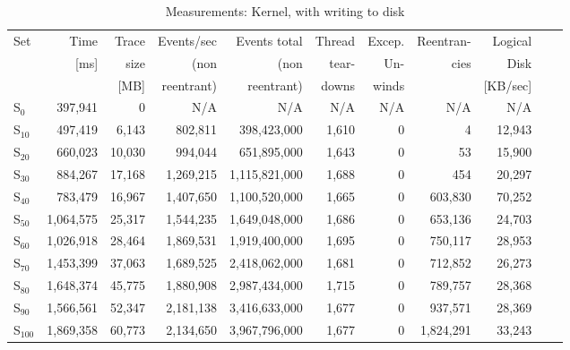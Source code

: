 \begin{table}[h] 
\footnotesize
\addtolength{\tabcolsep}{-2pt}
\caption{Measurements: Kernel, with writing to disk}
\label{MeasurementsKernelWithWriting}
\centering          

\begin{tabular}{l r r r r r r r r r r}    
\hline\hline 
Set				&	Time 		&	Trace &	Events/sec	&Events total	&	Thread 		&	Excep. 	&	Reentran-	&	Logical		 \\
					& [ms]		& size & (non					&(non 				&	tear-			& Un-			& cies			& Disk	 \\
					& 				& [MB] & reentrant)		& reentrant)	& downs			&	winds		&						& [KB/sec]				\\
\hline
S$_{0}$   &	397,941	&	0	&	N/A	&	N/A	&	N/A	&	N/A	&	N/A	&	N/A	\\
\hline
S$_{10}$ 	&	497,419	&	6,143	&	802,811	&	398,423,000	&	1,610	&	0	&	4	&	12,943	\\
S$_{20}$ 	&	660,023	&	10,030	&	994,044	&	651,895,000	&	1,643	&	0	&	53	&	15,900	\\
S$_{30}$ 	&	884,267	&	17,168	&	1,269,215	&	1,115,821,000	&	1,688	&	0	&	454	&	20,297	\\
S$_{40}$ 	&	783,479	&	16,967	&	1,407,650	&	1,100,520,000	&	1,665	&	0	&	603,830	&	70,252	\\
S$_{50}$ 	&	1,064,575	&	25,317	&	1,544,235	&	1,649,048,000	&	1,686	&	0	&	653,136	&	24,703	\\
S$_{60}$ 	&	1,026,918	&	28,464	&	1,869,531	&	1,919,400,000	&	1,695	&	0	&	750,117	&	28,953	\\
S$_{70}$ 	&	1,453,399	&	37,063	&	1,689,525	&	2,418,062,000	&	1,681	&	0	&	712,852	&	26,273	\\
S$_{80}$ 	&	1,648,374	&	45,775	&	1,880,908	&	2,987,434,000	&	1,715	&	0	&	789,757	&	28,368	\\
S$_{90}$ 	&	1,566,561	&	52,347	&	2,181,138	&	3,416,633,000	&	1,677	&	0	&	937,571	&	28,369	\\
S$_{100}$	&	1,869,358	&	60,773	&	2,134,650	&	3,967,796,000	&	1,677	&	0	&	1,824,291	&	33,243	\\
\hline
\end{tabular}
\end{table}

